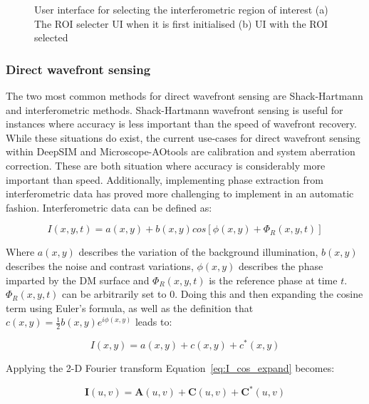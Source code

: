 \begin{figure}[h]
\begin{subfigure}{0.4\textwidth}
		\caption{}
		\label{fig:ROI_selector}
	\end{subfigure}
	\caption{User interface for selecting the interferometric region of interest (a) The ROI selecter UI when it is first initialised (b) UI with the ROI selected}
	\label{fig:ROI_selectors}
\end{figure}

\subsubsection{Direct wavefront sensing}
\label{subsubsec:direct_wavefront_sensing}

The two most common methods for direct wavefront sensing are Shack-Hartmann and interferometric methods. Shack-Hartmann wavefront sensing is useful for instances where accuracy is less important than the speed of wavefront recovery. While these situations do exist, the current use-cases for direct wavefront sensing within DeepSIM and Microscope-AOtools are calibration and system aberration correction. These are both situation where accuracy is considerably more important than speed. Additionally, implementing phase extraction from interferometric data has proved more challenging  to implement in an automatic fashion. Interferometric data can be defined as:

\begin{equation}\label{eq:I_basic}
I(x,y,t) = a(x,y) + b(x,y)cos[\phi(x,y) + \Phi_{R}(x,y,t)]
\end{equation}

Where $a(x,y)$ describes the variation of the background illumination, $b(x,y)$ describes the noise and contrast variations, $\phi(x,y)$ describes the phase imparted by the DM surface and $\Phi_{R}(x,y,t)$ is the reference phase at time $t$. $\Phi_{R}(x,y,t)$ can be arbitrarily set to 0. Doing this and then expanding the cosine term using Euler's formula, as well as the definition that $c(x,y) = \frac{1}{2}b(x,y)e^{i\phi(x,y)}$ leads to:

\begin{equation}\label{eq:I_cos_expand}
I(x,y) = a(x,y) + c(x,y) + c^{*}(x,y)
\end{equation}

Applying the 2-D Fourier transform Equation~\ref{eq:I_cos_expand} becomes:

\begin{equation}\label{eq:I_fourier}
\boldsymbol{I}(u,v) = \boldsymbol{A}(u,v) + \boldsymbol{C}(u,v) + \boldsymbol{C}^{*}(u,v)
\end{equation}


